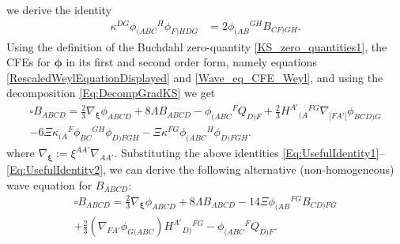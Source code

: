 \documentclass[10pt,a4paper]{article}
\theoremstyle{plain}
\begin{document}
we derive the identity
\begin{align}
  \kappa^{DG}\phi_{(ABC}{}^H\phi_{F)HDG}&=2\phi_{(AB}{}^{GH}B_{CF)GH}.
  \label{Eq:UsefulIdentity2}
\end{align}
Using the definition of the Buchdahl zero-quantity
\eqref{KS_zero_quantities1}, the CFEs for $\bm\phi$ in its first and
second order form, namely equations
\eqref{RescaledWeylEquationDisplayed} and \eqref{Wave_eq_CFE_Weyl},
and using the decomposition \eqref{Eq:DecompGradKS} we get
\begin{multline} 
  \square B_{ABCD} = \tfrac{2}{3} \nabla_{\bm\xi}\phi_{ABCD} + 8
  \Lambda B_{ABCD} - \phi_{(ABC}{}^{F}Q_{D)F} + \tfrac{2}{3}
  H^{A'}{}_{(A}{}^{FG}\nabla_{|FA'|}\phi_{BCD)G} \\ - 6 \Xi
  \kappa_{(A}{}^{F}\phi_{BC}{}^{GH}\phi_{D)FGH} - \Xi
  \kappa^{FG}\phi_{(ABC}{}^{H}\phi_{D)FGH}.
\end{multline}
where $\nabla_{\bm\xi} := \xi^{AA'}\nabla_{AA'}$. Substituting the
above identities
\eqref{Eq:UsefulIdentity1}--\eqref{Eq:UsefulIdentity2}, we can derive
the following alternative (non-homogeneous) wave equation for
$B_{ABCD}$:
\begin{multline}
    \square B_{ABCD} = \tfrac{2}{3}\nabla_{\bm\xi}\phi_{ABCD} +
    8\Lambda B_{ABCD} - 14\Xi \phi_{(AB}{}^{FG}B_{CD)FG} \\ +
    \tfrac{2}{3}(\nabla_{FA'}\phi_{G(ABC})H^{A'}{}_{D)}{}^{FG} -
    \phi_{(ABC}{}^{F}Q_{D)F}. \label{Eq:SecondWaveEqForB}
\end{multline}
\end{document}
